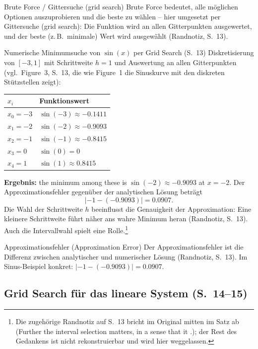 \begin{defbox}{Brute Force / Gittersuche (grid search)}
Brute Force bedeutet, alle möglichen Optionen auszuprobieren und die beste zu wählen -- hier umgesetzt per Gittersuche (grid search): Die Funktion wird an allen Gitterpunkten ausgewertet, und der beste (z.\,B.\ minimale) Wert wird ausgewählt (Randnotiz, S.~13).
\end{defbox}

\begin{bspbox}{Numerische Minimumsuche von $\sin(x)$ per Grid Search (S.~13)}
Diskretisierung von $[-3,1]$ mit Schrittweite $h = 1$ und Auswertung an allen Gitterpunkten (vgl.\ Figure~3, S.~13, die wie Figure~1 die Sinuskurve mit den diskreten Stützstellen zeigt):
\begin{center}
\begin{tabular}{ll}
\toprule
$x_i$ & Funktionswert \\
\midrule
$x_0 = -3$ & $\sin(-3) \approx -0.1411$ \\
$x_1 = -2$ & $\sin(-2) \approx -0.9093$ \\
$x_2 = -1$ & $\sin(-1) \approx -0.8415$ \\
$x_3 = 0$  & $\sin(0) = 0$ \\
$x_4 = 1$  & $\sin(1) \approx 0.8415$ \\
\bottomrule
\end{tabular}
\end{center}
\textbf{Ergebnis:} \glqq the minimum among these is $\sin(-2) \approx -0.9093$ at $x = -2$.\grqq{} Der Approximationsfehler gegenüber der analytischen Lösung beträgt
\[
|-1 - (-0.9093)| = 0.0907.
\]
Die Wahl der Schrittweite $h$ beeinflusst die Genauigkeit der Approximation: Eine kleinere Schrittweite führt näher ans wahre Minimum heran (Randnotiz, S.~13). Auch die Intervallwahl spielt eine Rolle.\footnote{Die zugehörige Randnotiz auf S.~13 bricht im Original mitten im Satz ab (\glqq Further the interval selection matters, in a sense that it .\grqq); der Rest des Gedankens ist nicht rekonstruierbar und wird hier weggelassen.}
\end{bspbox}

\begin{defbox}{Approximationsfehler (Approximation Error)}
Der Approximationsfehler ist die Differenz zwischen analytischer und numerischer Lösung (Randnotiz, S.~13). Im Sinus-Beispiel konkret: $|-1 - (-0.9093)| = 0.0907$.
\end{defbox}

\subsection{Grid Search für das lineare System (S.~14--15)}

